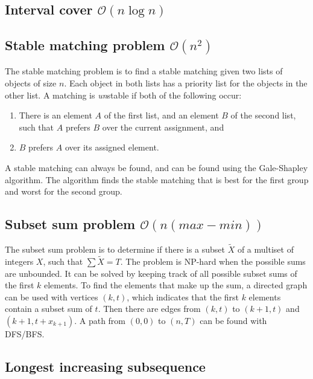\subsection{Interval cover $\mathcal O(n\log n)$}




\subsection{Stable matching problem $\mathcal O(n^2)$}

The stable matching problem is to find a stable matching given two lists of objects of size $n$. Each object in both lists has a priority list for the objects in the other list. A matching is \textit{un}stable if both of the following occur:
\begin{enumerate}
    \item There is an element $A$ of the first list, and an element $B$ of the second list, such that $A$ prefers $B$ over the current assignment, and
    \item $B$ prefers $A$ over its assigned element.
\end{enumerate}
A stable matching can always be found, and can be found using the Gale-Shapley algorithm. The algorithm finds the stable matching that is best for the first group and worst for the second group.



\subsection{Subset sum problem $\mathcal O(n(max - min))$}

The subset sum problem is to determine if there is a subset $\tilde X$ of a multiset of integers $X$, such that $\sum \tilde X = T$. The problem is NP-hard when the possible sums are unbounded. It can be solved by keeping track of all possible subset sums of the first $k$ elements. To find the elements that make up the sum, a directed graph can be used with vertices $(k, t)$, which indicates that the first $k$ elements contain a subset sum of $t$. Then there are edges from $(k, t)$ to $(k + 1, t)$ and $(k + 1, t + x_{k + 1})$. A path from $(0, 0)$ to $(n, T)$ can be found with DFS/BFS.



\subsection{Longest increasing subsequence}

